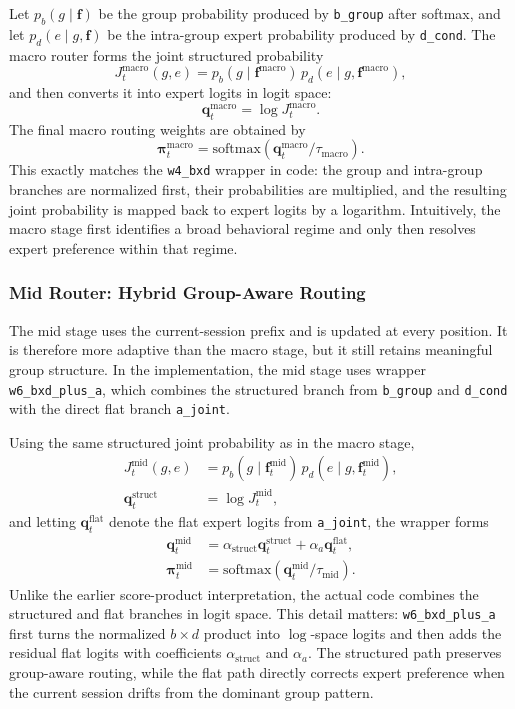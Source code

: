 \documentclass[sigconf,authordraft]{acmart}
\begin{document}
Let $p_b(g \mid \mathbf{f})$ be the group probability produced by \texttt{b\_group} after softmax, and let $p_d(e \mid g,\mathbf{f})$ be the intra-group expert probability produced by \texttt{d\_cond}. The macro router forms the joint structured probability
\[
J^{\mathrm{macro}}_t(g,e)
=
p_b(g \mid \mathbf{f}^{\mathrm{macro}})\,
p_d(e \mid g, \mathbf{f}^{\mathrm{macro}}),
\]
and then converts it into expert logits in logit space:
\[
\mathbf{q}^{\mathrm{macro}}_t
=
\log J^{\mathrm{macro}}_t.
\]
The final macro routing weights are obtained by
\[
\boldsymbol{\pi}^{\mathrm{macro}}_t
=
\mathrm{softmax}\!\left(\mathbf{q}^{\mathrm{macro}}_t/\tau_{\mathrm{macro}}\right).
\]
This exactly matches the \texttt{w4\_bxd} wrapper in code: the group and intra-group branches are normalized first, their probabilities are multiplied, and the resulting joint probability is mapped back to expert logits by a logarithm. Intuitively, the macro stage first identifies a broad behavioral regime and only then resolves expert preference within that regime.

\subsubsection{Mid Router: Hybrid Group-Aware Routing}

The mid stage uses the current-session prefix and is updated at every position. It is therefore more adaptive than the macro stage, but it still retains meaningful group structure. In the implementation, the mid stage uses wrapper \texttt{w6\_bxd\_plus\_a}, which combines the structured branch from \texttt{b\_group} and \texttt{d\_cond} with the direct flat branch \texttt{a\_joint}.

Using the same structured joint probability as in the macro stage,
\begin{align}
J^{\mathrm{mid}}_t(g,e)
&=
p_b(g \mid \mathbf{f}^{\mathrm{mid}}_t)\,
p_d(e \mid g, \mathbf{f}^{\mathrm{mid}}_t), \\
\mathbf{q}^{\mathrm{struct}}_t
&=
\log J^{\mathrm{mid}}_t,
\end{align}
and letting $\mathbf{q}^{\mathrm{flat}}_t$ denote the flat expert logits from \texttt{a\_joint}, the wrapper forms
\begin{align}
\mathbf{q}^{\mathrm{mid}}_t
&=
\alpha_{\mathrm{struct}} \mathbf{q}^{\mathrm{struct}}_t
+
\alpha_a \mathbf{q}^{\mathrm{flat}}_t,
\\
\boldsymbol{\pi}^{\mathrm{mid}}_t
&=
\mathrm{softmax}\!\left(\mathbf{q}^{\mathrm{mid}}_t / \tau_{\mathrm{mid}}\right).
\end{align}
Unlike the earlier score-product interpretation, the actual code combines the structured and flat branches in logit space. This detail matters: \texttt{w6\_bxd\_plus\_a} first turns the normalized $b \times d$ product into $\log$-space logits and then adds the residual flat logits with coefficients $\alpha_{\mathrm{struct}}$ and $\alpha_a$. The structured path preserves group-aware routing, while the flat path directly corrects expert preference when the current session drifts from the dominant group pattern.
\end{document}
